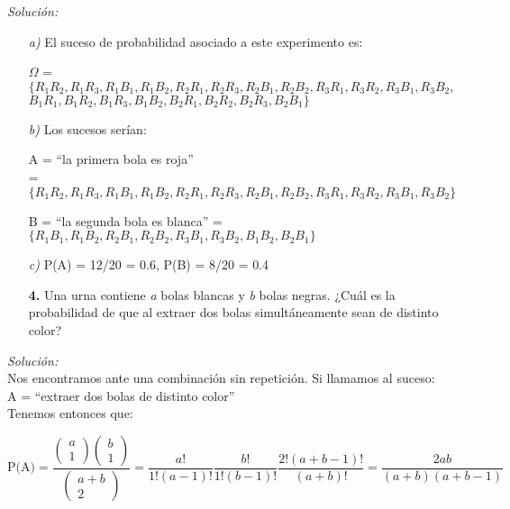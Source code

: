 \documentclass[11pt,a4paper]{article}
\theoremstyle{definition}
\begin{document}
\emph{Solución:}


\begin{itemize}
	\item[\emph{a)}] El suceso de probabilidad asociado a este experimento es:
	\item[] $\Omega$ = $\{R_1R_2, R_1R_3, R_1B_1, R_1B_2, R_2R_1, R_2R_3, R_2B_1, R_2B_2, R_3R_1, R_3R_2, R_3B_1, R_3B_2,$\\
	\hspace*{1cm}$B_1R_1, B_1R_2, B_1R_3, B_1B_2, B_2R_1, B_2R_2, B_2R_3, B_2B_1\}$
	\item[\emph{b)}] Los sucesos serían:
	\item[] A = ``la primera bola es roja''\\
	\hspace*{0.425cm}= $\{R_1R_2, R_1R_3, R_1B_1, R_1B_2, R_2R_1, R_2R_3, R_2B_1, R_2B_2, R_3R_1, R_3R_2, R_3B_1, R_3B_2\}$
	\item[] B = ``la segunda bola es blanca'' = $\{R_1B_1, R_1B_2, R_2B_1, R_2B_2, R_3B_1, R_3B_2, B_1B_2, B_2B_1\}$
	\item[\emph{c)}] P(A) = 12/20 = 0.6, P(B) = 8/20 = 0.4
\end{itemize}



\pagebreak

\begin{itemize}
	\item[\textbf{4.}] Una urna contiene \emph{a} bolas blancas y \emph{b} bolas negras. ¿Cuál es la probabilidad de que al extraer dos bolas simultáneamente sean de distinto color?
\end{itemize}


{\color{grey}\hrulefill}

\emph{Solución:}\\

Nos encontramos ante una combinación sin repetición. Si llamamos al suceso:\\

\hspace{1cm}A = ``extraer dos bolas de distinto color''\\

Tenemos entonces que:

$$\text{P(A)} = \frac{\left(\begin{matrix}a \\ 1\end{matrix}\right) \left(\begin{matrix}b \\ 1\end{matrix}\right)}{\left(\begin{matrix}a+b \\ 2\end{matrix}\right)}=\frac{a!}{1! (a-1)!}\frac{b!}{1!(b-1)!}\frac{2!(a+b-1)!}{(a+b)!}=\frac{2ab}{(a+b)(a+b-1)}$$
\end{document}
